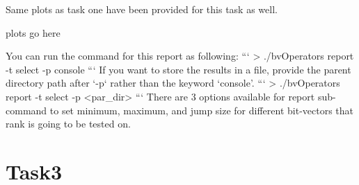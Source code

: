 \documentclass[11pt]{article}
\begin{document}
    Same plots as task one have been provided for this task as well.


    plots go here



    You can run the command for this report as following:
    ```
    > ./bvOperators report -t select -p console
    ```
    If you want to store the results in a file, provide the parent directory path after `-p` rather than the keyword `console'.
    ```
    > ./bvOperators report -t select -p <par_dir>
    ```
    There are 3 options available for report sub-command to set minimum, maximum, and jump size for different bit-vectors that rank is going to be tested on.

    \section{Task3}
\end{document}
